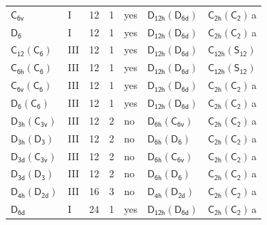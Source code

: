 \documentclass[10pt,a4paper]{article}
\numberwithin{equation}{section}
\newcommand{\grp}[1]{\mathsf{#1}}
\newcommand{\clsletter}[1]{\,{\scriptsize\color{black!55}#1}}
\begin{document}
{\begin{longtable}{@{}llrrlll@{}}
\href{../../../rotation/data/pdf/C6v.pdf}{$\grp{C_{6v}}$} & I & 12 & 1 & yes & \href{D12h-D6d.pdf}{$\grp{D_{12h}}(\grp{D_{6d}})$} & \href{C2h-C2.pdf}{$\grp{C_{2h}}(\grp{C_{2}})$}\clsletter{a}\\
\href{../../../rotation/data/pdf/D6.pdf}{$\grp{D_{6}}$} & I & 12 & 1 & yes & \href{D12h-D6d.pdf}{$\grp{D_{12h}}(\grp{D_{6d}})$} & \href{C2h-C2.pdf}{$\grp{C_{2h}}(\grp{C_{2}})$}\clsletter{a}\\
\href{C12-C6.pdf}{$\grp{C_{12}}(\grp{C_{6}})$} & III & 12 & 1 & yes & \href{D12h-D6d.pdf}{$\grp{D_{12h}}(\grp{D_{6d}})$} & \href{C12h-S12.pdf}{$\grp{C_{12h}}(\grp{S_{12}})$}\\
\href{C6h-C6.pdf}{$\grp{C_{6h}}(\grp{C_{6}})$} & III & 12 & 1 & yes & \href{D12h-D6d.pdf}{$\grp{D_{12h}}(\grp{D_{6d}})$} & \href{C12h-S12.pdf}{$\grp{C_{12h}}(\grp{S_{12}})$}\\
\href{C6v-C6.pdf}{$\grp{C_{6v}}(\grp{C_{6}})$} & III & 12 & 1 & yes & \href{D12h-D6d.pdf}{$\grp{D_{12h}}(\grp{D_{6d}})$} & \href{C2h-C2.pdf}{$\grp{C_{2h}}(\grp{C_{2}})$}\clsletter{a}\\
\href{D6-C6.pdf}{$\grp{D_{6}}(\grp{C_{6}})$} & III & 12 & 1 & yes & \href{D12h-D6d.pdf}{$\grp{D_{12h}}(\grp{D_{6d}})$} & \href{C2h-C2.pdf}{$\grp{C_{2h}}(\grp{C_{2}})$}\clsletter{a}\\
\href{D3h-C3v.pdf}{$\grp{D_{3h}}(\grp{C_{3v}})$} & III & 12 & 2 & no & \href{D6h-C6v.pdf}{$\grp{D_{6h}}(\grp{C_{6v}})$} & \href{C2h-C2.pdf}{$\grp{C_{2h}}(\grp{C_{2}})$}\clsletter{a}\\
\href{D3h-D3.pdf}{$\grp{D_{3h}}(\grp{D_{3}})$} & III & 12 & 2 & no & \href{D6h-D6.pdf}{$\grp{D_{6h}}(\grp{D_{6}})$} & \href{C2h-C2.pdf}{$\grp{C_{2h}}(\grp{C_{2}})$}\clsletter{a}\\
\href{D3d-C3v.pdf}{$\grp{D_{3d}}(\grp{C_{3v}})$} & III & 12 & 2 & no & \href{D6h-C6v.pdf}{$\grp{D_{6h}}(\grp{C_{6v}})$} & \href{C2h-C2.pdf}{$\grp{C_{2h}}(\grp{C_{2}})$}\clsletter{a}\\
\href{D3d-D3.pdf}{$\grp{D_{3d}}(\grp{D_{3}})$} & III & 12 & 2 & no & \href{D6h-D6.pdf}{$\grp{D_{6h}}(\grp{D_{6}})$} & \href{C2h-C2.pdf}{$\grp{C_{2h}}(\grp{C_{2}})$}\clsletter{a}\\
\href{D4h-D2d.pdf}{$\grp{D_{4h}}(\grp{D_{2d}})$} & III & 16 & 3 & no & \href{D4h-D2d.pdf}{$\grp{D_{4h}}(\grp{D_{2d}})$} & \href{C2h-C2.pdf}{$\grp{C_{2h}}(\grp{C_{2}})$}\clsletter{a}\\
\href{../../../rotation/data/pdf/D6d.pdf}{$\grp{D_{6d}}$} & I & 24 & 1 & yes & \href{D12h-D6d.pdf}{$\grp{D_{12h}}(\grp{D_{6d}})$} & \href{C2h-C2.pdf}{$\grp{C_{2h}}(\grp{C_{2}})$}\clsletter{a}\\

\end{longtable}}
\end{document}
